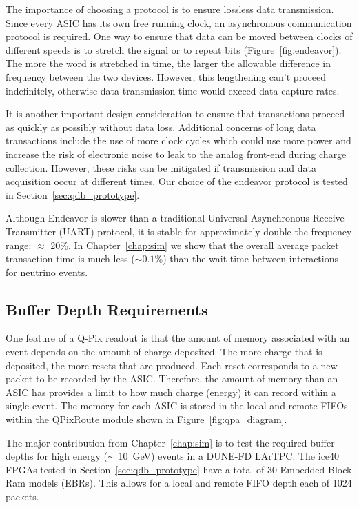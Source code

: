 The importance of choosing a protocol is to ensure lossless data transmission.
Since every ASIC has its own free running clock, an asynchronous communication protocol is required.
One way to ensure that data can be moved between clocks of different speeds is to stretch the signal or to repeat bits (Figure~\ref{fig:endeavor}).
The more the word is stretched in time, the larger the allowable difference in frequency between the two devices.
However, this lengthening can't proceed indefinitely, otherwise data transmission time would exceed data capture rates.

It is another important design consideration to ensure that transactions proceed as quickly as possibly without data loss.
Additional concerns of long data transactions include the use of more clock cycles which could use more power and increase the risk of electronic noise to leak to the analog front-end during charge collection.
However, these risks can be mitigated if transmission and data acquisition occur at different times.
Our choice of the endeavor protocol is tested in Section~\ref{sec:qdb_prototype}.

Although Endeavor is slower than a traditional Universal Asynchronous Receive Transmitter (UART) protocol, it is stable for approximately double the frequency range: $\approx$ 20\%.
In Chapter~\ref{chap:sim} we show that the overall average packet transaction time is much less ($\sim 0.1\%$) than the wait time between interactions for neutrino events.

\subsection{Buffer Depth Requirements}\label{sec:buffer_requirements}
One feature of a Q-Pix readout is that the amount of memory associated with an event depends on the amount of charge deposited.
The more charge that is deposited, the more resets that are produced.
Each reset corresponds to a new packet to be recorded by the ASIC.
Therefore, the amount of memory than an ASIC has provides a limit to how much charge (energy) it can record within a single event.
The memory for each ASIC is stored in the local and remote FIFOs within the QPixRoute module shown in Figure~\ref{fig:qpa_diagram}.

The major contribution from Chapter~\ref{chap:sim} is to test the required buffer depths for high energy ($\sim$ 10~\unit{GeV}) events in a DUNE-FD LArTPC.
The ice40 FPGAs tested in Section~\ref{sec:qdb_prototype} have a total of 30 Embedded Block Ram models (EBRs).
This allows for a local and remote FIFO depth each of 1024 packets.

